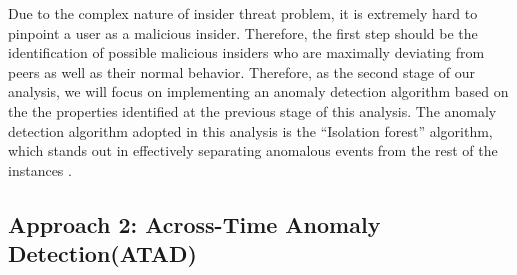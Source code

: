 \documentclass[conference]{IEEEtran}
\begin{document}
Due to the complex nature of insider threat problem, it is extremely hard to pinpoint a user as a malicious insider. Therefore, the first step should be the identification of possible malicious insiders who are maximally deviating from peers as well as their normal behavior. Therefore, as the second stage of our analysis, we will focus on implementing an anomaly detection algorithm based on the the  properties identified at the previous stage of this analysis. The anomaly detection algorithm adopted in this analysis is the “Isolation forest” algorithm, which stands out in effectively separating anomalous events from the rest of the instances \cite{b43}.

\subsection{Approach 2: Across-Time Anomaly Detection(ATAD)}
\end{document}
